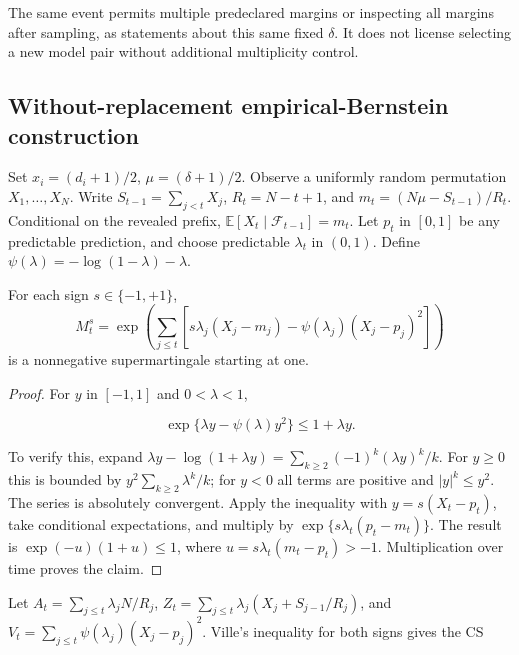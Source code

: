 The same event permits multiple predeclared margins or inspecting all margins after sampling, as statements about this same fixed \(\delta\). It does not license selecting a new model pair without additional multiplicity control.

\subsection{Without-replacement empirical-Bernstein construction}\label{theory:3}

Set \(x_i=(d_i+1)/2\), \(\mu=(\delta+1)/2\). Observe a uniformly random permutation \(X_1,\ldots,X_N\). Write \(S_{t-1}=\sum_{j<t}X_j\), \(R_t=N-t+1\), and \(m_t=(N\mu-S_{t-1})/R_t\). Conditional on the revealed prefix, \(\mathbb E[X_t\mid\mathcal F_{t-1}]=m_t\). Let \(p_t\) in \([0,1]\) be any predictable prediction, and choose predictable \(\lambda_t\) in \((0,1)\). Define \(\psi(\lambda)=-\log(1-\lambda)-\lambda\).

\begin{lemma}\label{app-lemma2} For each sign \(s\in\{-1,+1\}\),
\begin{equation}\label{eq:proofs-1}
M_t^s=\exp\!\left(\sum_{j\le t}\left[s\lambda_j(X_j-m_j)-\psi(\lambda_j)(X_j-p_j)^2\right]\right)
\end{equation}
is a nonnegative supermartingale starting at one.
\end{lemma}

\begin{proof} For \(y\) in \([-1,1]\) and \(0<\lambda<1\),

\begin{equation}\label{eq:proofs-2}
\exp\{\lambda y-\psi(\lambda)y^2\}\le 1+\lambda y.
\end{equation}

To verify this, expand \(\lambda y-\log(1+\lambda y)=\sum_{k\ge2}(-1)^k(\lambda y)^k/k\). For \(y\ge 0\) this is bounded by \(y^2\sum_{k\ge2}\lambda^k/k\); for \(y<0\) all terms are positive and \(|y|^k\le y^2\). The series is absolutely convergent. Apply the inequality with \(y=s(X_t-p_t)\), take conditional expectations, and multiply by \(\exp\{s\lambda_t(p_t-m_t)\}\). The result is \(\exp(-u)(1+u)\le1\), where \(u=s\lambda_t(m_t-p_t)>-1\). Multiplication over time proves the claim. \end{proof}

Let \(A_t=\sum_{j\le t}\lambda_jN/R_j\), \(Z_t=\sum_{j\le t}\lambda_j(X_j+S_{j-1}/R_j)\), and \(V_t=\sum_{j\le t}\psi(\lambda_j)(X_j-p_j)^2\). Ville's inequality for both signs gives the CS

